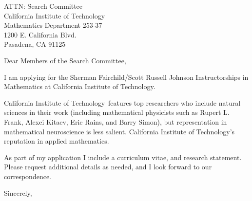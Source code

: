 \documentclass[11pt,a4paper]{letter}
\begin{document}

\def\School{California Institute of Technology}

\begin{letter}
{ATTN: Search Committee\\
California Institute of Technology\\
Mathematics Department 253-37\\
1200 E. California Blvd.\\
Pasadena, CA 91125}


\opening{Dear Members of the Search Committee,}

I am applying for the Sherman Fairchild/Scott Russell Johnson Instructorships in Mathematics at \School. 



\School~features top researchers who include natural sciences in their work (including mathematical physicists such as Rupert L. Frank, Alexei Kitaev, Eric Rains, and Barry Simon), but representation in mathematical neuroscience is less salient. \School's reputation in applied mathematics.



As part of my application I include a curriculum vitae, and research statement. Please request additional details as needed, and I look forward to our correspondence.

\closing{Sincerely,}
\end{letter}
\end{document}
